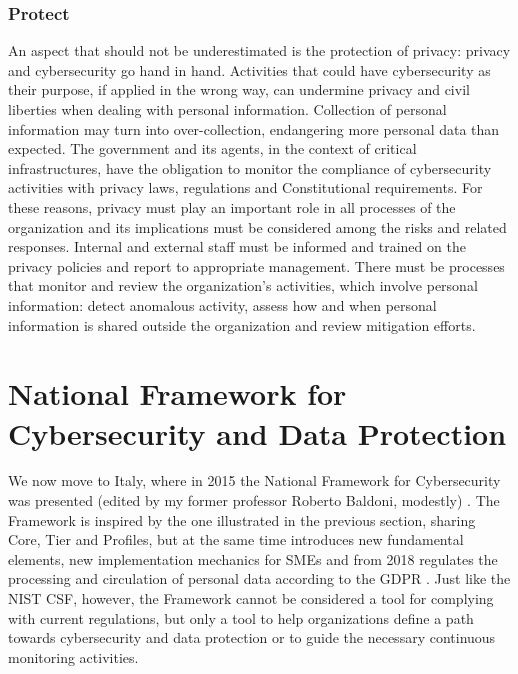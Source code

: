 \subsubsection{Protect}
An aspect that should not be underestimated is the protection of privacy: privacy and cybersecurity go hand in hand. Activities that could have cybersecurity as their purpose, if applied in the wrong way, can undermine privacy and civil liberties when dealing with personal information. Collection of personal information may turn into over-collection, endangering more personal data than expected. The government and its agents, in the context of critical infrastructures, have the obligation to monitor the compliance of cybersecurity activities with privacy laws, regulations and Constitutional requirements. For these reasons, privacy must play an important role in all processes of the organization and its implications must be considered among the risks and related responses. Internal and external staff must be informed and trained on the privacy policies and report to appropriate management. There must be processes that monitor and review the organization's activities, which involve personal information: detect anomalous activity, assess how and when personal information is shared outside the organization and review mitigation efforts.
\section{National Framework for Cybersecurity and Data Protection}
We now move to Italy, where in 2015 the National Framework for Cybersecurity was presented (edited by my former professor Roberto Baldoni, modestly) \cite{CISSAP2015}. The Framework is inspired by the one illustrated in the previous section, sharing Core, Tier and Profiles, but at the same time introduces new fundamental elements, new implementation mechanics for SMEs and from 2018 regulates the processing and circulation of personal data according to the GDPR \cite{CISSAP2019}. Just like the NIST CSF, however, the Framework cannot be considered a tool for complying with current regulations, but only a tool to help organizations define a path towards cybersecurity and data protection or to guide the necessary continuous monitoring activities.
